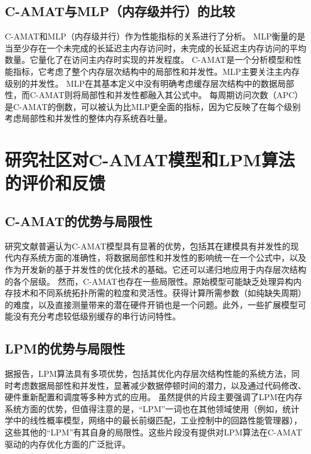 \documentclass[UTF8]{ctexart}
\begin{document}
\subsection{C-AMAT与MLP（内存级并行）的比较}
C-AMAT和MLP（内存级并行）作为性能指标的关系进行了分析\cite{sun2018optimizing}。
MLP衡量的是当至少存在一个未完成的长延迟主内存访问时，未完成的长延迟主内存访问的平均数量\cite{sun2018optimizing}。它量化了在访问主内存时实现的并发程度。
C-AMAT是一个分析模型和性能指标，它考虑了整个内存层次结构中的局部性和并发性\cite{sun2018optimizing}。MLP主要关注主内存级别的并发性。
MLP在其基本定义中没有明确考虑缓存层次结构中的数据局部性，而C-AMAT则将局部性和并发性都融入其公式中\cite{sun2018optimizing}。
每周期访问次数（APC）是C-AMAT的倒数，可以被认为比MLP更全面的指标，因为它反映了在每个级别考虑局部性和并发性的整体内存系统吞吐量\cite{sunCAMATPage}。

\section{研究社区对C-AMAT模型和LPM算法的评价和反馈}

\subsection{C-AMAT的优势与局限性}
研究文献普遍认为C-AMAT模型具有显著的优势\cite{illustrationCAMATPureMiss}，包括其在建模具有并发性的现代内存系统方面的准确性，将数据局部性和并发性的影响统一在一个公式中，以及作为开发新的基于并发性的优化技术的基础。它还可以递归地应用于内存层次结构的各个层级。
然而，C-AMAT也存在一些局限性\cite{feng2022proceedings}。原始模型可能缺乏处理异构内存技术和不同系统拓扑所需的粒度和灵活性。获得计算所需参数（如纯缺失周期）的难度，以及直接测量带来的潜在硬件开销也是一个问题。此外，一些扩展模型可能没有充分考虑较低级别缓存的串行访问特性。

\subsection{LPM的优势与局限性}
据报告，LPM算法具有多项优势\cite{liu2024lpm}，包括其优化内存层次结构性能的系统方法，同时考虑数据局部性和并发性，显著减少数据停顿时间的潜力，以及通过代码修改、硬件重新配置和调度等多种方式的应用。
虽然提供的片段主要强调了LPM在内存系统方面的优势，但值得注意的是，“LPM”一词也在其他领域使用（例如，统计学中的线性概率模型\cite{lpmProblemsDummies, lpmWiki}，网络中的最长前缀匹配\cite{githubLiblpm}，工业控制中的回路性能管理器），这些其他的“LPM”有其自身的局限性\cite{lpmProblemsDummies}。这些片段没有提供对LPM算法在C-AMAT驱动的内存优化方面的广泛批评。
\end{document}
